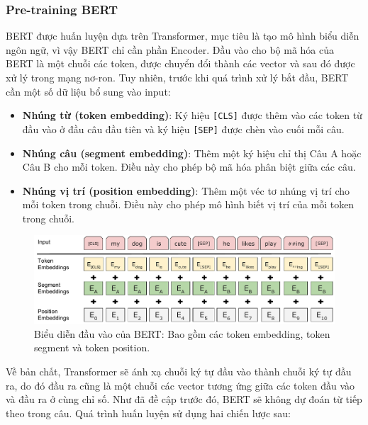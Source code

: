 \subsubsection{Pre-training BERT}

BERT được huấn luyện dựa trên Transformer, mục tiêu là tạo mô hình biểu diễn ngôn ngữ, vì vậy BERT chỉ cần phần Encoder. Đầu vào cho bộ mã hóa của BERT là một chuỗi các token, được chuyển đổi thành các vector và sau đó được xử lý trong mạng nơ-ron. Tuy nhiên, trước khi quá trình xử lý bắt đầu, BERT cần một số dữ liệu bổ sung vào input:

\begin{itemize}
    \item \textbf{Nhúng từ (token embedding)}: Ký hiệu {\tt [CLS]} được thêm vào các token từ đầu vào ở đầu câu đầu tiên và ký hiệu {\tt [SEP]} được chèn vào cuối mỗi câu.
    \item \textbf{Nhúng câu (segment embedding)}: Thêm một ký hiệu chỉ thị Câu A hoặc Câu B cho mỗi token. Điều này cho phép bộ mã hóa phân biệt giữa các câu.
    \item \textbf{Nhúng vị trí (position embedding)}: Thêm một véc tơ nhúng vị trí cho mỗi token trong chuỗi. Điều này cho phép mô hình biết vị trí của mỗi token trong chuỗi.
\end{itemize}

\begin{figure}[htb]
    \centering
    \includegraphics[width=\textwidth]{image/Input_Emebeddings.pdf}
    \caption{Biểu diễn đầu vào của BERT: Bao gồm các token embedding, token segment và token position.}
    \label{figure:Input_Emebeddings}
\end{figure}

Về bản chất, Transformer sẽ ánh xạ chuỗi ký tự đầu vào thành chuỗi ký tự đầu ra, do đó đầu ra cũng là một chuỗi các vector tương ứng giữa các token đầu vào và đầu ra ở cùng chỉ số. Như đã đề cập trước đó, BERT sẽ không dự đoán từ tiếp theo trong câu. Quá trình huấn luyện sử dụng hai chiến lược sau:

